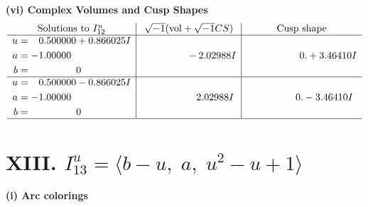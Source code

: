 \documentclass[1p]{elsarticle_modified}
\theoremstyle{definition}
\newcommand{\I}{\sqrt{-1}}
\begin{document}
\newpage\flushleft \textbf{(vi) Complex Volumes and Cusp Shapes}
$$\begin{array}{c|c|c}  
\text{Solutions to }I^u_{12}& \I (\text{vol} + \sqrt{-1}CS) & \text{Cusp shape}\\
 \hline 
\begin{aligned}
u &= \phantom{-}0.500000 + 0.866025 I \\
a &= -1.00000\phantom{ +0.000000I} \\
b &= \phantom{-0.000000 } 0\end{aligned}
 & \phantom{-0.000000 } -2.02988 I & \phantom{-0.000000 -}0. + 3.46410 I \\ \hline\begin{aligned}
u &= \phantom{-}0.500000 - 0.866025 I \\
a &= -1.00000\phantom{ +0.000000I} \\
b &= \phantom{-0.000000 } 0\end{aligned}
 & \phantom{-0.000000 -}2.02988 I & \phantom{-0.000000 } 0. - 3.46410 I\\
 \hline 
 \end{array}$$\newpage\newpage\renewcommand{\arraystretch}{1}
\centering \section*{XIII. $I^u_{13}= \langle b- u,\;a,\;u^2- u+1 \rangle$}
\flushleft \textbf{(i) Arc colorings}\\
\end{document}
